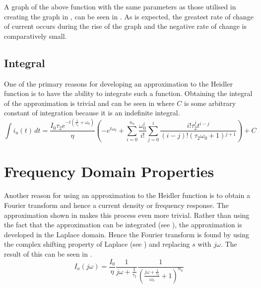 A graph of the above function with the same parameters as those utilised in creating the graph in , can be seen in .
As is expected, the greatest rate of change of current occurs during the rise of the graph and the negative rate of change is comparatively small.

\subsection{Integral}
One of the primary reasons for developing an approximation to the Heidler function is to have the ability to integrate such a function. Obtaining the integral of the approximation is trivial and can be seen in  where $C$ is some arbitrary constant of integration because it is an indefinite integral.
\label{sub:approx_integral}
\begin{equation}
    \int i_a \left( t \right) \, dt = \frac{I_0 \tau _2 e^{-t \left(\frac{1}{\tau _2}+\omega _0\right)}}{\eta } \left(-e^{t \omega _0} + \sum _{i=0}^{n_a} \frac{\omega _0^i}{i!} \sum _{j=0}^i \frac{i! \tau _2^j t^{i-j}}{(i-j)! \left(\tau _2 \omega _0+1\right){}^{j+1}}\right) + C
    \label{eqn:approxInt}
\end{equation}


\section{Frequency Domain Properties}
\label{sec:approx_frequency_domain_analysis}
Another reason for using an approximation to the Heidler function is to obtain a Fourier transform and hence a current density or frequency response. The approximation shown in  makes this process even more trivial. Rather than using the fact that the approximation can be integrated (see ), the approximation is developed in the Laplace domain. Hence the Fourier transform is found by using the complex shifting property of Laplace (see ) and replacing $s$ with $j\omega$. The result of this can be seen in .
\begin{equation}
    I_a \left( j\omega \right) = \frac{I_0}{\eta}\frac{1}{j\omega + \frac{1}{\tau_2}}\frac{1}{\left ( \frac{j\omega + \frac{1}{\tau_2}}{\omega_0} + 1 \right )^{n_a}}
    \label{eqn:approx_fourier}
\end{equation}

